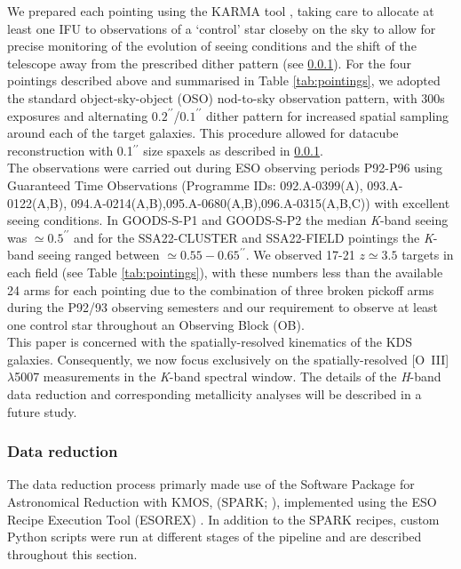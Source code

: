 \documentclass[fleqn,usenatbib]{mnras}
\begin{document}
\noindent
We prepared each pointing using the KARMA tool \citep{Wegner2008}, taking care to allocate at least one IFU to observations of a `control' star closeby on the sky to allow for precise monitoring of the evolution of seeing conditions and the shift of the telescope away from the prescribed dither pattern (see \cref{subsubsec:datareduction}).
For the four pointings described above and summarised in Table \ref{tab:pointings}, we adopted the standard object-sky-object (OSO) nod-to-sky observation pattern, with 300s exposures and alternating $0.2^{\prime\prime}$/$0.1^{\prime\prime}$ dither pattern for increased spatial sampling around each of the target galaxies.
This procedure allowed for datacube reconstruction with 0.1$^{\prime\prime}$ size spaxels as described in \cref{subsubsec:datareduction}. \\

\noindent
The observations were carried out during ESO observing periods P92-P96 using Guaranteed Time Observations (Programme IDs: 092.A-0399(A), 093.A-0122(A,B), 094.A-0214(A,B),095.A-0680(A,B),096.A-0315(A,B,C)) with excellent seeing conditions.
In GOODS-S-P1 and GOODS-S-P2 the median {\it K}-band seeing was $\simeq0.5^{\prime\prime}$ and for the SSA22-CLUSTER and SSA22-FIELD pointings the {\it K}-band seeing ranged between $\simeq0.55-0.65^{\prime\prime}$.
We observed 17-21 $z\simeq3.5$ targets in each field (see Table \ref{tab:pointings}), with these numbers less than the available 24 arms for each pointing due to the combination of three broken pickoff arms during the P92/93 observing semesters and our requirement to observe at least one control star throughout an Observing Block (OB). \\

\noindent
This paper is concerned with the spatially-resolved kinematics of the KDS galaxies.
Consequently, we now focus exclusively on the spatially-resolved [O~{\sc III}]$\lambda$5007 measurements in the {\it K}-band spectral window. 
The details of the {\it H}-band data reduction and corresponding metallicity analyses will be described in a future study.

\subsubsection{Data reduction}\label{subsubsec:datareduction}

The data reduction process primarly made use of the Software Package for Astronomical Reduction with KMOS, (SPARK; \citealt{Davies2013}), implemented using the ESO Recipe Execution Tool (ESOREX) \citep{Freudling2013}.
In addition to the SPARK recipes, custom Python scripts were run at different stages of the pipeline and are described throughout this section.
\end{document}
